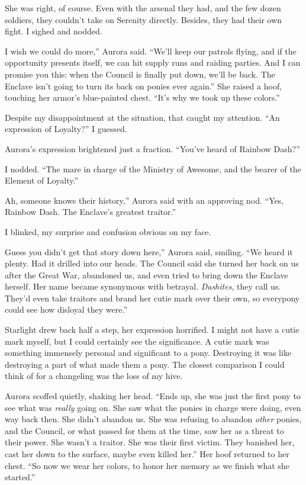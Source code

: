 She was right, of course. Even with the arsenal they had, and the few dozen soldiers, they couldn’t take on Serenity directly. Besides, they had their own fight. I sighed and nodded.

\leavevmode{}I wish we could do more,” Aurora said. “We’ll keep our patrols flying, and if the opportunity presents itself, we can hit supply runs and raiding parties. And I can promise you this: when the Council is finally put down, we’ll be back. The Enclave isn’t going to turn its back on ponies ever again.” She raised a hoof, touching her armor’s blue-painted chest. “It’s why we took up these colors.”

Despite my disappointment at the situation, that caught my attention. “An expression of Loyalty?” I guessed.

Aurora’s expression brightened just a fraction. “You’ve heard of Rainbow Dash?”

I nodded. “The mare in charge of the Ministry of Awesome, and the bearer of the Element of Loyalty.”

\leavevmode{}Ah, someone knows their history,” Aurora said with an approving nod. “Yes, Rainbow Dash. The Enclave’s greatest traitor.”

I blinked, my surprise and confusion obvious on my face.

\leavevmode{}Guess you didn’t get that story down here,” Aurora said, smiling. “We heard it plenty. Had it drilled into our heads. The Council said she turned her back on us after the Great War, abandoned us, and even tried to bring down the Enclave herself. Her name became synonymous with betrayal. \textit{Dashites}, they call us. They’d even take traitors and brand her cutie mark over their own, so everypony could see how disloyal they were.”

Starlight drew back half a step, her expression horrified. I might not have a cutie mark myself, but I could certainly see the significance. A cutie mark was something immensely personal and significant to a pony. Destroying it was like destroying a part of what made them a pony. The closest comparison I could think of for a changeling was the loss of my hive.

Aurora scoffed quietly, shaking her head. “Ends up, she was just the first pony to see what was \textit{really} going on. She saw what the ponies in charge were doing, even way back then. She didn’t abandon us. She was refusing to abandon \textit{other} ponies, and the Council, or what passed for them at the time, saw her as a threat to their power. She wasn’t a traitor. She was their first victim. They banished her, cast her down to the surface, maybe even killed her.” Her hoof returned to her chest. “So now we wear her colors, to honor her memory as we finish what she started.”

